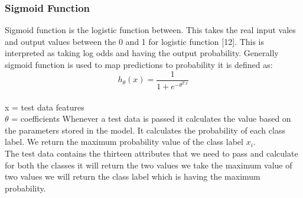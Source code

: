 \documentclass[oneside,12pt]{Classes/VTU}
\begin{document}
    		
    
    	\subsubsection{Sigmoid Function}
    		Sigmoid function is the logistic function between. This takes the 
    		real input vales and output values between the 0 and 1 for logistic 
    		function [12]. This is interpreted as taking log odds and having 
    		the output probability. Generally sigmoid function is used to map 
    		predictions to probability it is defined as:
    		\[ h_\theta(x) = \frac{1}{1 + e^{-\theta^{T.x}}} \]\\
    		x = test data features \\
    		$\theta$ = coefficients 
    		Whenever a  test  data is passed it calculates  the  value based on 
    		the parameters stored in the model. It calculates the probability 
    		of each class label. We return the maximum probability value of 
    		the class label $x_i$.\\
    		The test data contains the thirteen attributes that we need to pass 
    		and calculate   for both  the classes it will return  the two values 
    		we take the maximum value of two values we will return the class 
    		label which is having the maximum probability.
    	
    	
    	
    		
\end{document}

